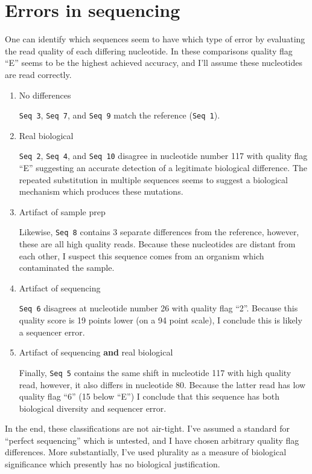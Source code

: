 \documentclass[12pt]{article}
\renewcommand{\=}[1]{\stackrel{#1}{=}} %
\theoremstyle{definition}
\begin{document}
	\section{Errors in sequencing}
	One can identify which sequences seem to have which type of error by evaluating the read quality of each differing nucleotide. In these comparisons quality flag ``E'' seems to be the highest achieved accuracy, and I'll assume these nucleotides are read correctly.

	\begin{enumerate}
		\item No differences
		
		\texttt{Seq 3}, \texttt{Seq 7}, and \texttt{Seq 9} match the reference (\texttt{Seq 1}).
		
		\item Real biological
		
		\texttt{Seq 2}, \texttt{Seq 4}, and \texttt{Seq 10} disagree in nucleotide number 117 with quality flag ``E'' suggesting an accurate detection of a legitimate biological difference. The repeated substitution in multiple sequences seems to suggest a biological mechanism which produces these mutations.

		\item Artifact of sample prep
		
		Likewise, \texttt{Seq 8} contains 3 separate differences from the reference, however, these are all high quality reads. Because these nucleotides are distant from each other, I suspect this sequence comes from an organism which contaminated the sample. 		
		
		\item Artifact of sequencing
		
		\texttt{Seq 6} disagrees at nucleotide number 26 with quality flag ``2''. Because this quality score is 19 points lower (on a 94 point scale), I conclude this is likely a sequencer error.		
		
		\item Artifact of sequencing \textbf{and} real biological
		
		Finally, \texttt{Seq 5} contains the same shift in nucleotide 117 with high quality read, however, it also differs in nucleotide 80. Because the latter read has low quality flag ``6'' (15 below ``E'') I conclude that this sequence has both biological diversity and sequencer error.
	\end{enumerate}

	In the end, these classifications are not air-tight. I've assumed a standard for ``perfect sequencing'' which is untested, and I have chosen arbitrary quality flag differences. More substantially, I've used plurality as a measure of biological significance which presently has no biological justification.
\end{document}
